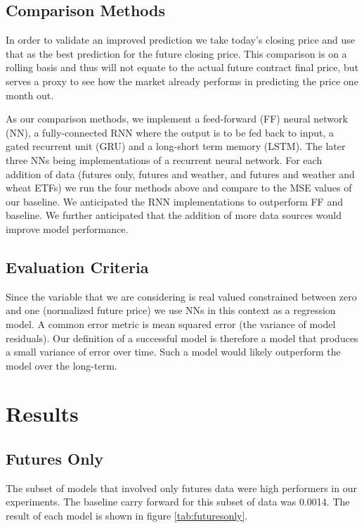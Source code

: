 \documentclass[twoside,11pt]{article}
\begin{document}
\subsection{Comparison Methods}

In order to validate an improved prediction we take today's closing price and use that as the best prediction for the future closing price. This comparison is on a rolling basis and thus will not equate to the actual future contract final price, but serves a proxy to see how the market already performs  in predicting the price one month out. 

As our comparison methods, we implement a feed-forward (FF) neural network (NN), a fully-connected RNN where the output is to be fed back to input, a gated recurrent unit (GRU) and a long-short term memory (LSTM). The later three NNs being implementations of a recurrent neural network. For each addition of data (futures only, futures and weather, and futures and weather and wheat ETFs) we run the four methods above and compare to the MSE values of our baseline. We anticipated the RNN implementations to outperform FF and baseline. We further anticipated that the addition of more data sources would improve model performance. 

\subsection{Evaluation Criteria}

Since the variable that we are considering is real valued constrained between zero and one (normalized future price) we use NNs in this context as a regression model. A common error metric is mean squared error (the variance of model residuals). Our definition of a successful model is therefore a model that produces a small variance of error over time. Such a model would likely outperform the model over the long-term. 

\section{Results} \label{results}

\subsection{Futures Only}

The subset of models that involved only futures data were high performers in our experiments. The baseline carry forward for this subset of data was 0.0014. The result of each model is shown in figure \ref{tab:futuresonly}.
\end{document}
